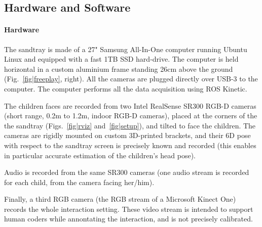 \documentclass{article}
\begin{document}
\subsection{Hardware and Software}

\paragraph{Hardware}
The sandtray is made of a 27" Samsung All-In-One computer running Ubuntu Linux
and equipped with a fast 1TB SSD hard-drive. The computer is held horizontal in
a custom aluminium frame standing 26cm above the ground
(Fig.~\ref{fig|freeplay}, right). All the cameras are plugged directly over
USB-3 to the computer. The computer performs all the data acquisition using ROS
Kinetic.

The children faces are recorded from two Intel RealSense SR300 RGB-D cameras
(short range, 0.2m to 1.2m, indoor RGB-D cameras), placed at the corners of the
the sandtray (Figs.~\ref{fig|rviz} and~\ref{fig|setup}), and tilted to face the
children. The cameras are rigidly mounted on custom 3D-printed brackets, and
their 6D pose with respect to the sandtray screen is precisely known and
recorded (this enables in particular accurate estimation of the children's head
pose).

Audio is recorded from the same SR300 cameras (one audio stream is recorded for
each child, from the camera facing her/him).

Finally, a third RGB camera (the RGB stream of a Microsoft Kinect One) records
the whole interaction setting. These video stream is intended to support human
coders while annontating the interaction, and is not precisely calibrated.
\end{document}
